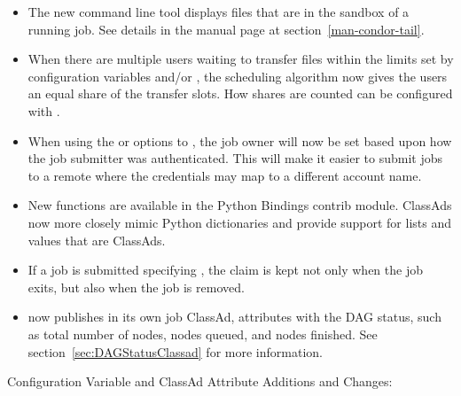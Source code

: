 \begin{itemize}

\item The new command line tool 
displays files that are in the sandbox of a running job.
See details in the manual page at
section~\ref{man-condor-tail}.

\item When there are multiple users
waiting to transfer files within the limits set by
configuration variables
 and/or
, the scheduling algorithm
now gives the users
an equal share of the transfer slots.  How shares are counted can be
configured with .

\item When using the  or  options to
, the job owner will now be set based
upon how the job submitter was authenticated. 
This will make it easier to submit jobs
to a remote  where the credentials may map to a different
account name.

\item New functions are available in the Python Bindings contrib module.
ClassAds now more closely mimic Python dictionaries and provide
support for lists and values that are ClassAds. 

\item If a job is submitted specifying ,
the claim is kept not only when the job exits,
but also when the job is removed.

\item {} now publishes in its own job ClassAd,
attributes with the DAG status,
such as total number of nodes, nodes queued, and nodes finished.
See section~\ref{sec:DAGStatusClassad} for more information.

\end{itemize}

\noindent Configuration Variable and ClassAd Attribute Additions and Changes:

